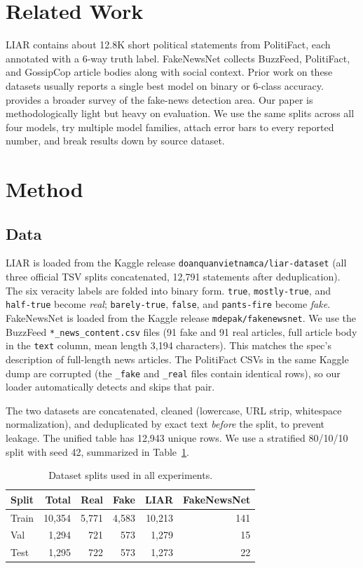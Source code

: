 \documentclass{article}
\begin{document}
\section{Related Work}

LIAR \citep{wang2017liar} contains about 12.8K short political statements from PolitiFact, each annotated with a 6-way truth label. FakeNewsNet \citep{shu2020fakenewsnet} collects BuzzFeed, PolitiFact, and GossipCop article bodies along with social context. Prior work on these datasets usually reports a single best model on binary or 6-class accuracy. \citet{zhou2020survey} provides a broader survey of the fake-news detection area. Our paper is methodologically light but heavy on evaluation. We use the same splits across all four models, try multiple model families, attach error bars to every reported number, and break results down by source dataset.

\section{Method}

\subsection{Data}
LIAR is loaded from the Kaggle release \texttt{doanquanvietnamca/liar-dataset} (all three official TSV splits concatenated, 12,791 statements after deduplication). The six veracity labels are folded into binary form. \texttt{true}, \texttt{mostly-true}, and \texttt{half-true} become \emph{real}; \texttt{barely-true}, \texttt{false}, and \texttt{pants-fire} become \emph{fake}. FakeNewsNet is loaded from the Kaggle release \texttt{mdepak/fakenewsnet}. We use the BuzzFeed \texttt{*\_news\_content.csv} files (91 fake and 91 real articles, full article body in the \texttt{text} column, mean length 3,194 characters). This matches the spec's description of full-length news articles. The PolitiFact CSVs in the same Kaggle dump are corrupted (the \texttt{\_fake} and \texttt{\_real} files contain identical rows), so our loader automatically detects and skips that pair.

The two datasets are concatenated, cleaned (lowercase, URL strip, whitespace normalization), and deduplicated by exact text \emph{before} the split, to prevent leakage. The unified table has 12,943 unique rows. We use a stratified 80/10/10 split with seed 42, summarized in Table~\ref{tab:splits}.

\begin{table}[h]
\centering
\caption{Dataset splits used in all experiments.}
\label{tab:splits}
\begin{tabular}{lrrrrr}
\toprule
Split & Total & Real & Fake & LIAR & FakeNewsNet \\
\midrule
Train & 10,354 & 5,771 & 4,583 & 10,213 & 141 \\
Val   & 1,294 & 721 & 573 & 1,279 & 15 \\
Test  & 1,295 & 722 & 573 & 1,273 & 22 \\
\bottomrule
\end{tabular}
\end{table}
\end{document}

